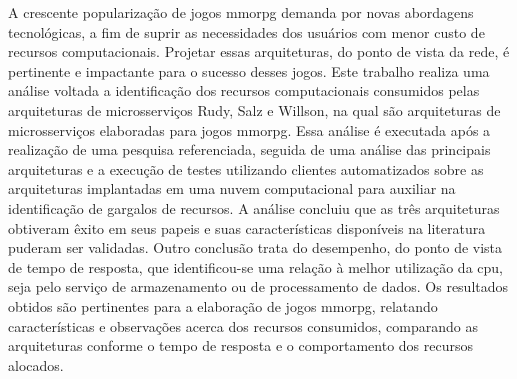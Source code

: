 A crescente popularização de jogos \acf{mmorpg} demanda por novas abordagens tecnológicas, a fim de suprir as necessidades dos usuários com menor custo de recursos computacionais.
%
Projetar essas arquiteturas, do ponto de vista da rede, é pertinente e impactante para o sucesso desses jogos.
%
Este trabalho realiza uma análise voltada a identificação dos recursos computacionais consumidos pelas arquiteturas de microsserviços Rudy, Salz e Willson, na qual são arquiteturas de microsserviços elaboradas para jogos \ac{mmorpg}.
%
Essa análise é executada após a realização de uma pesquisa referenciada, seguida de uma análise das principais arquiteturas e a execução de testes utilizando clientes automatizados sobre as arquiteturas implantadas em uma nuvem computacional para auxiliar na identificação de gargalos de recursos.
%
A análise concluiu que as três arquiteturas obtiveram êxito em seus papeis e suas características disponíveis na literatura puderam ser validadas.
%
Outro conclusão trata do desempenho, do ponto de vista de tempo de resposta, que identificou-se uma relação à melhor utilização da \ac{cpu}, seja pelo serviço de armazenamento ou de processamento de dados.
%
Os resultados obtidos são pertinentes para a elaboração de jogos \ac{mmorpg}, relatando características e observações acerca dos recursos consumidos, comparando as arquiteturas conforme o tempo de resposta e o comportamento dos recursos alocados.
